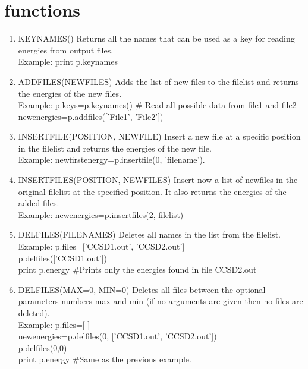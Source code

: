 \documentclass[a4paper, fleqn]{article}
\begin{document}
\section{functions}
\begin{enumerate}
\item{KEYNAMES()} Returns all the names that can be used as a key for reading energies from output files. \\
Example:
print p.keynames
\item{ADDFILES(NEWFILES)} Adds the list of new files to the filelist and returns the energies of the new files. \\
Example:
p.keys=p.keynames() \# Read all possible data from file1 and file2 \\
newenergies=p.addfiles(['File1', 'File2']) 
\item{INSERTFILE(POSITION, NEWFILE)} Insert a new file at a specific position in the filelist and returns the energies of the new file. \\
Example: newfirstenergy=p.insertfile(0, 'filename').
\item{INSERTFILES(POSITION, NEWFILES)} Insert now a list of newfiles in the original filelist at the specified position. It also returns the energies of the added files. \\
Example: newenergies=p.insertfiles(2, filelist) 
\item{DELFILES(FILENAMES)} Deletes all names in the list from the filelist. \\
Example: p.files=['CCSD1.out', 'CCSD2.out'] \\
p.delfiles(['CCSD1.out']) \\
print p.energy \#Prints only the energies found in file CCSD2.out
\item{DELFILES(MAX=0, MIN=0)} Deletes all files between the optional parameters numbers max and min (if no arguments are given then no files are deleted). \\
Example: 
p.files=[ ] \\
newenergies=p.delfiles(0, ['CCSD1.out', 'CCSD2.out']) \\
p.delfiles(0,0) \\
print p.energy \#Same as the previous example.
\end{enumerate}
\end{document}
